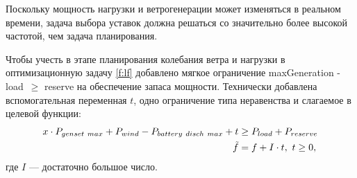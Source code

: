     Поскольку мощность нагрузки и ветрогенерации может изменяться в реальном времени, задача выбора уставок должна решаться со значительно более высокой частотой, чем задача планирования.
    
    
    
        
        
            
        Чтобы учесть в этапе планирования колебания ветра и нагрузки в оптимизационную задачу \ref{f:lf} добавлено мягкое ограничение 
        maxGeneration - load~$\geq$ reserve 
        на обеспечение запаса мощности.
        Технически добавлена вспомогательная переменная $t$, одно ограничение типа неравенства и слагаемое в целевой функции:
        \begin{equation}
            \begin{split}
                x \cdot P_{genset~max} + P_{wind} - P_{battery~disch~max} + t &\geq P_{load} + P_{reserve}\\
                \Tilde{f} &= f + I \cdot t, ~ t \geq 0,
            \end{split}
        \end{equation}
    где $I$ --- достаточно большое число.
    
